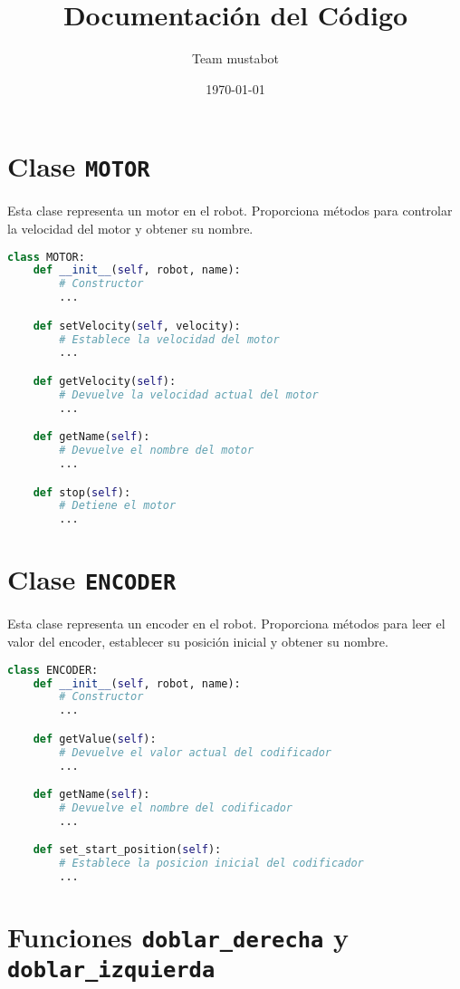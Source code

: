 \documentclass{article}
\title{Documentación del Código}
\author{Team mustabot}
\date{\today}
\begin{document}
\maketitle

\section{Clase \texttt{MOTOR}}

Esta clase representa un motor en el robot. Proporciona métodos para controlar la velocidad del motor y obtener su nombre.

\begin{lstlisting}[language=Python, frame=single, backgroundcolor=\color{gray!10}]
class MOTOR:
    def __init__(self, robot, name):
        # Constructor
        ...

    def setVelocity(self, velocity):
        # Establece la velocidad del motor
        ...

    def getVelocity(self):
        # Devuelve la velocidad actual del motor
        ...

    def getName(self):
        # Devuelve el nombre del motor
        ...

    def stop(self):
        # Detiene el motor
        ...
\end{lstlisting}

\section{Clase \texttt{ENCODER}}

Esta clase representa un encoder en el robot. Proporciona métodos para leer el valor del encoder, establecer su posición inicial y obtener su nombre.

\begin{lstlisting}[language=Python, frame=single, backgroundcolor=\color{gray!10}]
class ENCODER:
    def __init__(self, robot, name):
        # Constructor
        ...

    def getValue(self):
        # Devuelve el valor actual del codificador
        ...

    def getName(self):
        # Devuelve el nombre del codificador
        ...

    def set_start_position(self):
        # Establece la posicion inicial del codificador
        ...
\end{lstlisting}

\section{Funciones \texttt{doblar\_derecha} y \texttt{doblar\_izquierda}}
\end{document}
